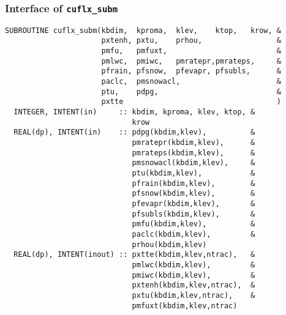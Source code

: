 \subsubsection{Interface of {\tt cuflx\_subm}}

\begin{lstlisting}[caption=cuflx\_subm]
SUBROUTINE cuflx_subm(kbdim,  kproma,  klev,    ktop,   krow, &
                      pxtenh, pxtu,    prhou,                 &
                      pmfu,   pmfuxt,                         &
                      pmlwc,  pmiwc,   pmratepr,pmrateps,     &
                      pfrain, pfsnow,  pfevapr, pfsubls,      &
                      paclc,  pmsnowacl,                      &
                      ptu,    pdpg,                           &
                      pxtte                                   )
  INTEGER, INTENT(in)     :: kbdim, kproma, klev, ktop, &
                             krow
  REAL(dp), INTENT(in)    :: pdpg(kbdim,klev),          &
                             pmratepr(kbdim,klev),      &
                             pmrateps(kbdim,klev),      &
                             pmsnowacl(kbdim,klev),     &
                             ptu(kbdim,klev),           &
                             pfrain(kbdim,klev),        &
                             pfsnow(kbdim,klev),        &
                             pfevapr(kbdim,klev),       &
                             pfsubls(kbdim,klev),       &
                             pmfu(kbdim,klev),          &
                             paclc(kbdim,klev),         &
                             prhou(kbdim,klev)           
  REAL(dp), INTENT(inout) :: pxtte(kbdim,klev,ntrac),   &
                             pmlwc(kbdim,klev),         &
                             pmiwc(kbdim,klev),         &
                             pxtenh(kbdim,klev,ntrac),  &
                             pxtu(kbdim,klev,ntrac),    &
                             pmfuxt(kbdim,klev,ntrac)
\end{lstlisting}

